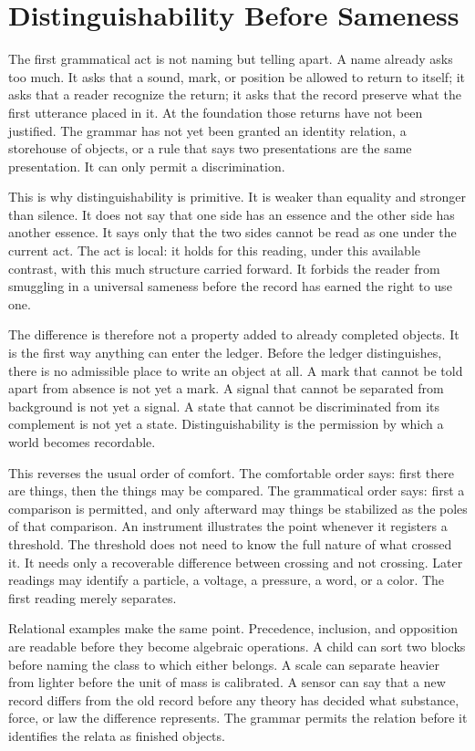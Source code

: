 \section{Distinguishability Before Sameness}

The first grammatical act is not naming but telling apart. A name
already asks too much. It asks that a sound, mark, or position be
allowed to return to itself; it asks that a reader recognize the return;
it asks that the record preserve what the first utterance placed in it.
At the foundation those returns have not been justified. The grammar has
not yet been granted an identity relation, a storehouse of objects, or a
rule that says two presentations are the same presentation. It can only
permit a discrimination.

This is why distinguishability is primitive. It is weaker than equality
and stronger than silence. It does not say that one side has an essence
and the other side has another essence. It says only that the two sides
cannot be read as one under the current act. The act is local: it holds
for this reading, under this available contrast, with this much structure
carried forward. It forbids the reader from smuggling in a universal
sameness before the record has earned the right to use one.

The difference is therefore not a property added to already completed
objects. It is the first way anything can enter the ledger. Before the
ledger distinguishes, there is no admissible place to write an object at
all. A mark that cannot be told apart from absence is not yet a mark. A
signal that cannot be separated from background is not yet a signal. A
state that cannot be discriminated from its complement is not yet a
state. Distinguishability is the permission by which a world becomes
recordable.

This reverses the usual order of comfort. The comfortable order says:
first there are things, then the things may be compared. The grammatical
order says: first a comparison is permitted, and only afterward may
things be stabilized as the poles of that comparison. An instrument
illustrates the point whenever it registers a threshold. The threshold
does not need to know the full nature of what crossed it. It needs only a
recoverable difference between crossing and not crossing. Later readings
may identify a particle, a voltage, a pressure, a word, or a color. The
first reading merely separates.

Relational examples make the same point. Precedence, inclusion, and
opposition are readable before they become algebraic operations. A child
can sort two blocks before naming the class to which either belongs. A
scale can separate heavier from lighter before the unit of mass is
calibrated. A sensor can say that a new record differs from the old
record before any theory has decided what substance, force, or law the
difference represents. The grammar permits the relation before it
identifies the relata as finished objects.

